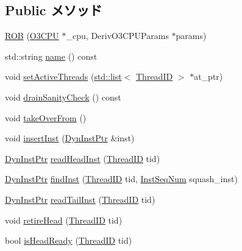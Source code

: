 \subsection*{Public メソッド}
\begin{DoxyCompactItemize}
\item 
\hyperlink{classROB_a0fac6595ed6513e7b81d9098f6f345fb}{ROB} (\hyperlink{classROB_a44622cf06940413482836cb62931ac3f}{O3CPU} $\ast$\_\-cpu, DerivO3CPUParams $\ast$params)
\item 
std::string \hyperlink{classROB_a37627d5d5bba7f4a8690c71c2ab3cb07}{name} () const 
\item 
void \hyperlink{classROB_aab96bdacf8bd420402cbb543f994e054}{setActiveThreads} (\hyperlink{classstd_1_1list}{std::list}$<$ \hyperlink{base_2types_8hh_ab39b1a4f9dad884694c7a74ed69e6a6b}{ThreadID} $>$ $\ast$at\_\-ptr)
\item 
void \hyperlink{classROB_a0240eb42fa57fe5d3788093f62b77347}{drainSanityCheck} () const 
\item 
void \hyperlink{classROB_a8674059ce345e23aac5086b2c3e24a43}{takeOverFrom} ()
\item 
void \hyperlink{classROB_aa5f3ce0db8d338ad004f89955f495fef}{insertInst} (\hyperlink{classROB_a028ce10889c5f6450239d9e9a7347976}{DynInstPtr} \&inst)
\item 
\hyperlink{classROB_a028ce10889c5f6450239d9e9a7347976}{DynInstPtr} \hyperlink{classROB_a5c156e82f6912abd14c61c6cc9b8000a}{readHeadInst} (\hyperlink{base_2types_8hh_ab39b1a4f9dad884694c7a74ed69e6a6b}{ThreadID} tid)
\item 
\hyperlink{classROB_a028ce10889c5f6450239d9e9a7347976}{DynInstPtr} \hyperlink{classROB_a6b0d3a4acdaebcd1eb294cb58a26be40}{findInst} (\hyperlink{base_2types_8hh_ab39b1a4f9dad884694c7a74ed69e6a6b}{ThreadID} tid, \hyperlink{inst__seq_8hh_a258d93d98edaedee089435c19ea2ea2e}{InstSeqNum} squash\_\-inst)
\item 
\hyperlink{classROB_a028ce10889c5f6450239d9e9a7347976}{DynInstPtr} \hyperlink{classROB_a6da43edd5511d34476626974724a32bf}{readTailInst} (\hyperlink{base_2types_8hh_ab39b1a4f9dad884694c7a74ed69e6a6b}{ThreadID} tid)
\item 
void \hyperlink{classROB_aa14c02115ece83633552be2368b60e67}{retireHead} (\hyperlink{base_2types_8hh_ab39b1a4f9dad884694c7a74ed69e6a6b}{ThreadID} tid)
\item 
bool \hyperlink{classROB_aafcd2d518fa9f1e1b1e4c166804ea0ce}{isHeadReady} (\hyperlink{base_2types_8hh_ab39b1a4f9dad884694c7a74ed69e6a6b}{ThreadID} tid)
\item 

\end{DoxyCompactItemize}

